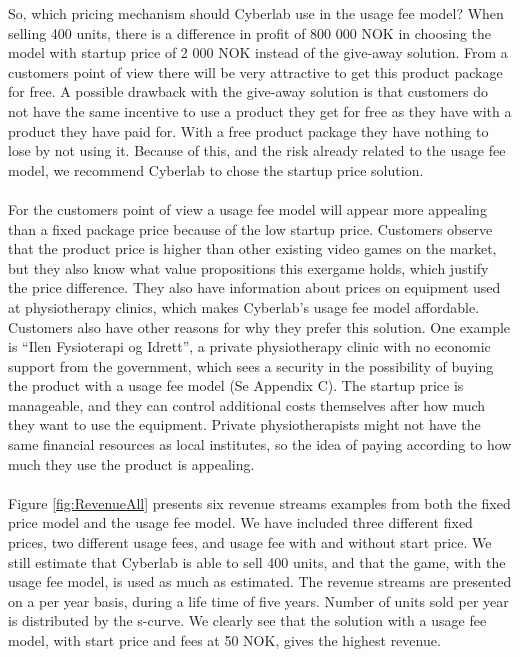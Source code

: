 So, which pricing mechanism should Cyberlab use in the usage fee model? When selling 400 units, there is a difference in profit of 800 000 NOK in choosing the model with startup price of 2 000 NOK instead of the give-away solution. From a customers point of view there will be very attractive to get this product package for free. A possible drawback with the give-away solution is that customers do not have the same incentive to use a product they get for free as they have with a product they have paid for. With a free product package they have nothing to lose by not using it. Because of this, and the risk already related to the usage fee model, we recommend Cyberlab to chose the startup price solution. \\ \\ 
For the customers point of view a usage fee model will appear more appealing than a fixed package price because of the low startup price. Customers observe that the product price is higher than other existing video games on the market, but they also know what value propositions this exergame holds, which justify the price difference. They also have information about prices on equipment used at physiotherapy clinics, which makes Cyberlab’s usage fee model affordable. Customers also have other reasons for why they prefer this solution. One example is “Ilen Fysioterapi og Idrett”, a private physiotherapy clinic with no economic support from the government, which sees a security in the possibility of buying the product with a usage fee model (Se Appendix C). The startup price is manageable, and they can control additional costs themselves after how much they want to use the equipment. Private physiotherapists might not have the same financial resources as local institutes, so the idea of paying according to how much they use the product is appealing.  \\ \\
Figure \ref{fig:RevenueAll} presents six revenue streams examples from both the fixed price model and the usage fee model. We have included three different fixed prices, two different usage fees, and usage fee with and without start price. We still estimate that Cyberlab is able to sell 400 units, and that the game, with the usage fee model, is used as much as estimated. The revenue streams are presented on a per year basis, during a life time of five years. Number of units sold per year is distributed by the s-curve. We clearly see that the solution with a usage fee model, with start price and fees at 50 NOK, gives the highest revenue.  
